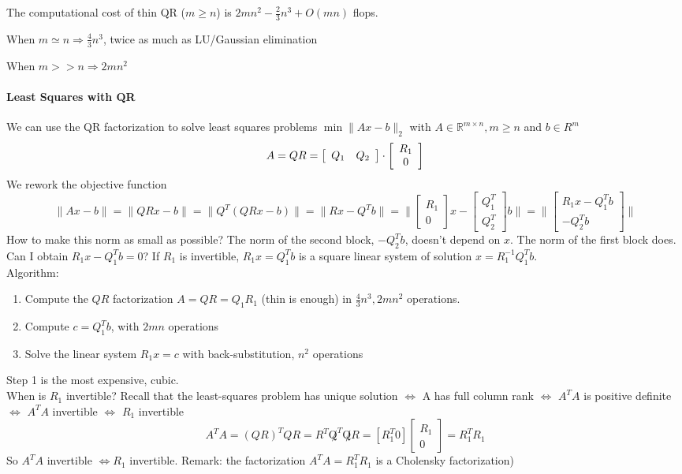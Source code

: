 \documentclass[10pt]{report}
\begin{document}
The computational cost of thin QR ($m\geq n$) is $2mn^2-\frac{2}{3}n^3+ O(mn)$ flops.
\begin{list}{}{}
	\item When $m\simeq n \Rightarrow \frac{4}{3}n^3$, twice as much as LU/Gaussian elimination
	\item When $m>>n\Rightarrow 2mn^2$
\end{list}
\paragraph{Least Squares with QR} We can use the QR factorization to solve least squares problems $\min\|Ax-b\|_2$ with $A\in\mathbb{R}^{m\times n}, m\geq n$ and $b\in R^m$
$$A = QR = \left[\begin{array}{c c}
Q_1&Q_2
\end{array}\right]\cdot\left[\begin{array}{c}
R_1\\0
\end{array}\right]$$
We rework the objective function $$\|Ax-b\| = \|QRx-b\|=\|Q^T(QRx-b)\|=\|Rx-Q^Tb\| =\|\left[\begin{array}{c}
R_1\\0
\end{array}\right]x-\left[\begin{array}{c}
Q_1^T\\Q_2^T
\end{array}\right]b\| = \|\left[\begin{array}{c}
R_1x-Q_1^Tb\\-Q_2^Tb
\end{array}\right]\|$$
How to make this norm as small as possible? The norm of the second block, $-Q_2^Tb$, doesn't depend on $x$. The norm of the first block does. Can I obtain $R_1x - Q_1^Tb = 0$? If $R_1$ is invertible, $R_1x=Q_1^Tb$ is a square linear system of solution $x = R_1^{-1}Q_1^Tb$.\\
Algorithm:
\begin{enumerate}
	\item Compute the $QR$ factorization $A = QR = Q_1R_1$ (thin is enough) in $\frac{4}{3}n^3,2mn^2$ operations.
	\item Compute $c = Q_1^Tb$, with $2mn$ operations
	\item Solve the linear system $R_1x=c$ with back-substitution, $n^2$ operations
\end{enumerate}
Step 1 is the most expensive, cubic.\\
When is $R_1$ invertible? Recall that the least-squares problem has unique solution $\Leftrightarrow$ A has full column rank $\Leftrightarrow$ $A^TA$ is positive definite $\Leftrightarrow$ $A^TA$ invertible $\Leftrightarrow$ $R_1$ invertible
$$A^TA = (QR)^TQR = R^T\not Q^T\not QR = [R_1^T 0]\left[\begin{array}{c}
R_1\\0
\end{array}\right] = R_1^TR_1$$
So $A^TA$ invertible $\Leftrightarrow R_1$ invertible. Remark: the factorization $A^TA=R_1^TR_1$ is a Cholensky factorization)
\pagebreak
\end{document}
